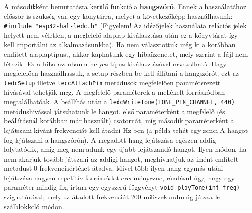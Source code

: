 \documentclass[12pt,a4paper]{article}
\begin{document}
      A másodikként bemutatásra kerülő funkció a \textbf{hangszóró}. Ennek a használatához először is szükség van egy könytárra, melyet a következőképp használhatunk: \texttt{\#include "esp32-hal-ledc.h"} (Figyelem! Az idézőjelek használata relációs jelek helyett nem véletlen, a megfelelő alaplap kiválasztása után ez a könyvtárat így kell importálni az alkalmazásunkba).  Ha nem választottuk még ki a korábban említett alaplaptípust, akkor kaphatunk egy hibaüzenetet, mely szerint a fájl nem létezik. Ez a hiba azonban a helyes típus kiválasztásával orvosolható. Hogy megfelelően használhassuk, a setup részben be kell állítani a hangszórót, ezt az \texttt{ledcSetup} illetve \texttt{ledcAttachPin} metódusok megfelelően paraméterezett hívásával tehetjük meg. A megfelelő paraméterek a mellékelt forráskódban megtalálhatóak.
      A beállítás után a \texttt{ledcWriteTone(TONE\_PIN\_CHANNEL, 440)} metódushívással játszhatunk le hangot, első paraméterként a megfelelő (és beállításnál korábban már használt) csatornát, míg második paraméterként a lejátszani kívánt frekvenciát kell átadni Hz-ben (a példa tehát egy zenei A hangot fog lejátszani a hangszórón). A megadott hang lejátszása egészen addig folytatódik, amíg meg nem adunk egy újabb lejátszandó hangot. Ilyen módon, ha nem akarjuk tovább játszani az addigi hangot, meghívhatjuk az imént említett metódust 0 frekvenciaértéket átadva. Mivel több ilyen hang egymás utáni lejátszása nagyon repetitív forráskódot eredményezne, ráadásul úgy, hogy egy paraméter mindig fix, írtam egy egyszerű függvényt \texttt{void playTone(int freq)} szignatúrával, mely az átadott frekvenciát 200 miliszekundumig játsza le szálblokkoló módon.
\end{document}
